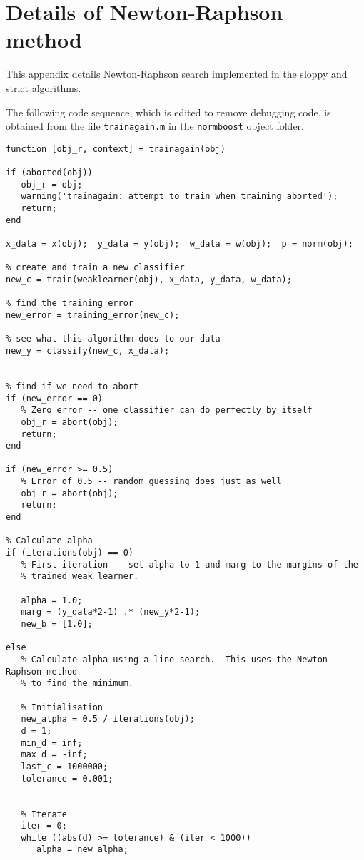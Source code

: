 
\chapter{Details of Newton-Raphson method}
\label{appendix:newton-raphson}

This appendix details Newton-Raphson search implemented in the sloppy
and strict algorithms.

The following code sequence, which is edited to remove debugging code,
is obtained from the file {\tt trainagain.m} in the {\tt normboost}
object folder.

{\small
\begin{verbatim}
function [obj_r, context] = trainagain(obj)

if (aborted(obj))
   obj_r = obj;
   warning('trainagain: attempt to train when training aborted');
   return;
end

x_data = x(obj);  y_data = y(obj);  w_data = w(obj);  p = norm(obj);

% create and train a new classifier
new_c = train(weaklearner(obj), x_data, y_data, w_data);

% find the training error
new_error = training_error(new_c);

% see what this algorithm does to our data
new_y = classify(new_c, x_data);


% find if we need to abort
if (new_error == 0)
   % Zero error -- one classifier can do perfectly by itself
   obj_r = abort(obj);
   return;
end

if (new_error >= 0.5)
   % Error of 0.5 -- random guessing does just as well
   obj_r = abort(obj);
   return;
end

% Calculate alpha
if (iterations(obj) == 0)
   % First iteration -- set alpha to 1 and marg to the margins of the
   % trained weak learner.

   alpha = 1.0;
   marg = (y_data*2-1) .* (new_y*2-1);
   new_b = [1.0];

else
   % Calculate alpha using a line search.  This uses the Newton-Raphson method
   % to find the minimum.

   % Initialisation
   new_alpha = 0.5 / iterations(obj);
   d = 1;
   min_d = inf;
   max_d = -inf;
   last_c = 1000000;
   tolerance = 0.001;
   
   
   % Iterate
   iter = 0;
   while ((abs(d) >= tolerance) & (iter < 1000))
      alpha = new_alpha;
      

\end{verbatim}}
